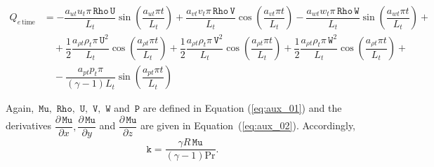 \documentclass[10pt]{article}
\newcommand{\diff}[2] {\dfrac{\partial #1}{\partial #2}}
\newcommand{\Rho}{\,\mathtt{Rho}}
\newcommand{\PP}{\,\mathtt{P}}
\newcommand{\U}{\,\mathtt{U}}
\newcommand{\V}{\,\mathtt{V}}
\newcommand{\W}{\,\mathtt{W}}
\newcommand{\Mu}{\,\mathtt{Mu}}
\newcommand{\DMuDx}{\diff{\Mu}{x}}
\newcommand{\DMuDy}{\diff{\Mu}{y}}
\newcommand{\DMuDz}{\diff{\Mu}{z}}
\newcommand{\timee}{\,\text{time}}
\newcommand{\convection}{\,\text{convection}}
\newcommand{\conduction}{\,\text{conduction}}
\newcommand{\workpressure}{\,\text{pressure work}}
\newcommand{\workviscous}{\,\text{viscous work}}
\begin{document}
\begin{equation*}
\begin{split}
%
Q_{e \timee} &= -\dfrac{a_{ut} u_t \pi \Rho \U }{L_t} \sin\left(\dfrac{a_{ut} \pi t}{L_t}\right) 
+\dfrac{a_{vt} v_t \pi \Rho \V }{L_t} \cos\left(\dfrac{a_{vt} \pi t}{L_t}\right) 
-\dfrac{a_{wt} w_t \pi \Rho \W }{L_t} \sin\left(\dfrac{a_{wt} \pi t}{L_t}\right) +\\
  &\quad 
+\dfrac{1}{2} \dfrac{a_{\rho t} \rho_t \pi \U^2 }{L_t} \cos\left(\dfrac{a_{\rho t} \pi t}{L_t}\right)
+\dfrac{1}{2} \dfrac{a_{\rho t} \rho_t \pi \V^2 }{L_t} \cos\left(\dfrac{a_{\rho t} \pi t}{L_t}\right)
+\dfrac{1}{2} \dfrac{a_{\rho t} \rho_t \pi \W^2 }{L_t} \cos\left(\dfrac{a_{\rho t} \pi t}{L_t}\right) +\\
  &\quad
-\dfrac{a_{pt} p_t \pi }{(\gamma-1) L_t}\sin\left(\dfrac{a_{pt} \pi t}{L_t}\right)
%
\end{split}
\end{equation*}

Again, $\Mu,\, \Rho,\,\U,\,\V,\,\W$ and $\PP$ are defined in Equation (\ref{eq:aux_01}) and the derivatives $\DMuDx,\DMuDy$ and $\DMuDz$ are given in Equation~(\ref{eq:aux_02}).
Accordingly,
$$\texttt{k}=\dfrac{\gamma R \Mu}{(\gamma-1)\text{Pr}}.$$
\end{document}
